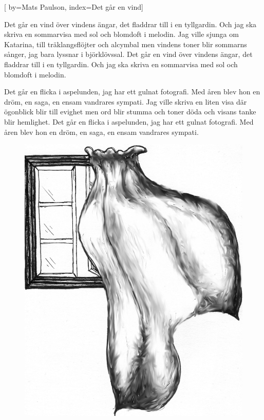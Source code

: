 


[ 	%
	by={Mats Paulson},
	index={Det går en vind}]		%
	
\beginverse*		%
Det går en vind över vindens ängar,
det fladdrar till i en tyllgardin.
Och jag ska skriva en sommarvisa
med sol och blomdoft i melodin.
Jag ville sjunga om Katarina,
till träklangsflöjter och alcymbal
men vindens toner blir sommarns sånger,
jag bara lyssnar i björklövssal.
Det går en vind över vindens ängar,
det fladdrar till i en tyllgardin.
Och jag ska skriva en sommarvisa
med sol och blomdoft i melodin.
\endverse			%

\beginverse*		%
Det går en flicka i aspelunden,
jag har ett gulnat fotografi.
Med åren blev hon en dröm, en saga,
en ensam vandrares sympati.
Jag ville skriva en liten visa
där ögonblick blir till evighet
men ord blir stumma och toner döda
och visans tanke blir hemlighet.
Det går en flicka i aspelunden,
jag har ett gulnat fotografi.
Med åren blev hon en dröm, en saga,
en ensam vandrares sympati.
\endverse			%
\endsong			%

\begin{figure}[!b]
\begin{center}
\includegraphics[scale=.4]{../bilder/tyllgardin.jpg} 
\end{center}
\end{figure}
